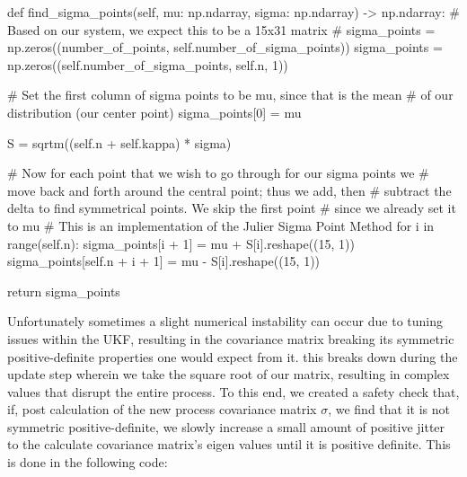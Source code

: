 \documentclass{article}
\begin{document}
\begin{python}
    def find_sigma_points(self, mu: np.ndarray, sigma: np.ndarray) -> np.ndarray:
    # Based on our system, we expect this to be a 15x31 matrix
    # sigma_points = np.zeros((number_of_points, self.number_of_sigma_points))
    sigma_points = np.zeros((self.number_of_sigma_points, self.n, 1))

    # Set the first column of sigma points to be mu, since that is the mean
    # of our distribution (our center point)
    sigma_points[0] = mu

    S = sqrtm((self.n + self.kappa) * sigma)

    # Now for each point that we wish to go through for our sigma points we
    # move back and forth around the central point; thus we add, then
    # subtract the delta to find symmetrical points. We skip the first point
    # since we already set it to mu
    # This is an implementation of the Julier Sigma Point Method
    for i in range(self.n):
    sigma_points[i + 1] = mu + S[i].reshape((15, 1))
    sigma_points[self.n + i + 1] = mu - S[i].reshape((15, 1))

    return sigma_points
\end{python}

Unfortunately sometimes a slight numerical instability can occur due to tuning issues within the UKF, resulting in the covariance matrix breaking its symmetric positive-definite properties one would expect from it. this breaks down during the update step wherein we take the square root of our matrix, resulting in complex values that disrupt the entire process. To this end, we created a safety check that, if, post calculation of the new process covariance matrix $\sigma$, we find that it is not symmetric positive-definite, we slowly increase a small amount of positive jitter to the calculate covariance matrix's eigen values until it is positive definite. This is done in the following code:
\end{document}

